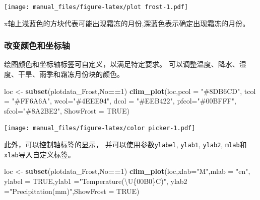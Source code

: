 \documentclass[
]{ctexart}
\newenvironment{Shaded}{\begin{snugshade}}{\end{snugshade}}
\newcommand{\AttributeTok}[1]{\textcolor[rgb]{0.13,0.29,0.53}{#1}}
\newcommand{\ConstantTok}[1]{\textcolor[rgb]{0.56,0.35,0.01}{#1}}
\newcommand{\DecValTok}[1]{\textcolor[rgb]{0.00,0.00,0.81}{#1}}
\newcommand{\FunctionTok}[1]{\textcolor[rgb]{0.13,0.29,0.53}{\textbf{#1}}}
\newcommand{\NormalTok}[1]{#1}
\newcommand{\OtherTok}[1]{\textcolor[rgb]{0.56,0.35,0.01}{#1}}
\newcommand{\SpecialCharTok}[1]{\textcolor[rgb]{0.81,0.36,0.00}{\textbf{#1}}}
\newcommand{\StringTok}[1]{\textcolor[rgb]{0.31,0.60,0.02}{#1}}
\begin{document}
\texttt{[image: manual\_files/figure-latex/plot frost-1.pdf]}

x轴上浅蓝色的方块代表可能出现霜冻的月份,深蓝色表示确定出现霜冻的月份。

\hypertarget{ux6539ux53d8ux989cux8272ux548cux5750ux6807ux8f74}{%
\subsubsection{改变颜色和坐标轴}\label{ux6539ux53d8ux989cux8272ux548cux5750ux6807ux8f74}}

绘图颜色和坐标轴标签可自定义，以满足特定要求。
可以调整温度、降水、湿度、干旱、雨季和霜冻月份块的颜色。

\begin{Shaded}
\begin{Highlighting}[]
\NormalTok{loc }\OtherTok{\textless{}{-}} \FunctionTok{subset}\NormalTok{(plotdata\_Frost,No}\SpecialCharTok{==}\DecValTok{1}\NormalTok{)}
\FunctionTok{clim\_plot}\NormalTok{(loc,}\AttributeTok{pcol =} \StringTok{"\#8DB6CD"}\NormalTok{,}
          \AttributeTok{tcol =} \StringTok{"\#FF6A6A"}\NormalTok{,}
          \AttributeTok{wcol=}\StringTok{"\#4EEE94"}\NormalTok{,}
          \AttributeTok{dcol =} \StringTok{"\#EEB422"}\NormalTok{,}
          \AttributeTok{pfcol=}\StringTok{"\#00BFFF"}\NormalTok{,}
          \AttributeTok{sfcol=}\StringTok{"\#8A2BE2"}\NormalTok{,}
          \AttributeTok{ShowFrost =} \ConstantTok{TRUE}\NormalTok{)}
\end{Highlighting}
\end{Shaded}

\texttt{[image: manual\_files/figure-latex/color picker-1.pdf]}

此外，可以控制轴标签的显示， 并可以使用参数\texttt{ylabel},
\texttt{ylab1}, \texttt{ylab2},
\texttt{mlab}和\texttt{xlab}导入自定义标签。

\begin{Shaded}
\begin{Highlighting}[]
\NormalTok{loc }\OtherTok{\textless{}{-}} \FunctionTok{subset}\NormalTok{(plotdata\_Frost,No}\SpecialCharTok{==}\DecValTok{1}\NormalTok{)}
\FunctionTok{clim\_plot}\NormalTok{(loc,}\AttributeTok{xlab=}\StringTok{"M"}\NormalTok{,}\AttributeTok{mlab =} \StringTok{"en"}\NormalTok{,}
          \AttributeTok{ylabel =} \ConstantTok{TRUE}\NormalTok{,}\AttributeTok{ylab1 =}\StringTok{"Temperature(\textbackslash{}U\{00B0\}C)"}\NormalTok{,}
          \AttributeTok{ylab2 =}\StringTok{"Precipitation(mm)"}\NormalTok{,}\AttributeTok{ShowFrost =} \ConstantTok{TRUE}\NormalTok{)}
\end{Highlighting}
\end{Shaded}
\end{document}
